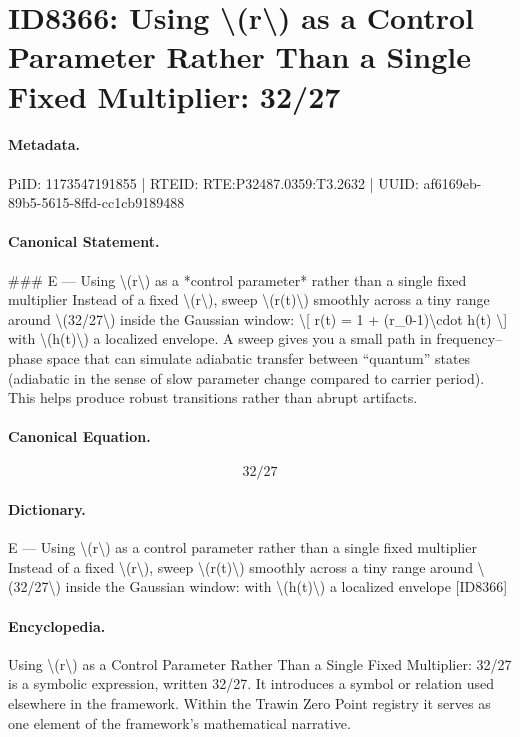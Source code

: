 \section*{ID8366: Using \textbackslash{}(r\textbackslash{}) as a Control Parameter Rather Than a Single Fixed Multiplier: 32/27}
\paragraph{Metadata.}
PiID: 1173547191855 | RTEID: RTE:P32487.0359:T3.2632 | UUID: af6169eb-89b5-5615-8ffd-cc1cb9189488

\paragraph{Canonical Statement.}
\#\#\# E — Using \textbackslash{}(r\textbackslash{}) as a *control parameter* rather than a single fixed multiplier Instead of a fixed \textbackslash{}(r\textbackslash{}), sweep \textbackslash{}(r(t)\textbackslash{}) smoothly across a tiny range around \textbackslash{}(32/27\textbackslash{}) inside the Gaussian window: \textbackslash{}[ r(t) = 1 + (r\_0-1)\textbackslash{}cdot h(t) \textbackslash{}] with \textbackslash{}(h(t)\textbackslash{}) a localized envelope. A sweep gives you a small path in frequency–phase space that can simulate adiabatic transfer between “quantum” states (adiabatic in the sense of slow parameter change compared to carrier period). This helps produce robust transitions rather than abrupt artifacts.

\paragraph{Canonical Equation.}
\[
32/27
\]

\paragraph{Dictionary.}
E — Using \textbackslash{}(r\textbackslash{}) as a control parameter rather than a single fixed multiplier Instead of a fixed \textbackslash{}(r\textbackslash{}), sweep \textbackslash{}(r(t)\textbackslash{}) smoothly across a tiny range around \textbackslash{}(32/27\textbackslash{}) inside the Gaussian window: with \textbackslash{}(h(t)\textbackslash{}) a localized envelope [ID8366]

\paragraph{Encyclopedia.}
Using \textbackslash{}(r\textbackslash{}) as a Control Parameter Rather Than a Single Fixed Multiplier: 32/27 is a symbolic expression, written 32/27. It introduces a symbol or relation used elsewhere in the framework. Within the Trawin Zero Point registry it serves as one element of the framework's mathematical narrative.
